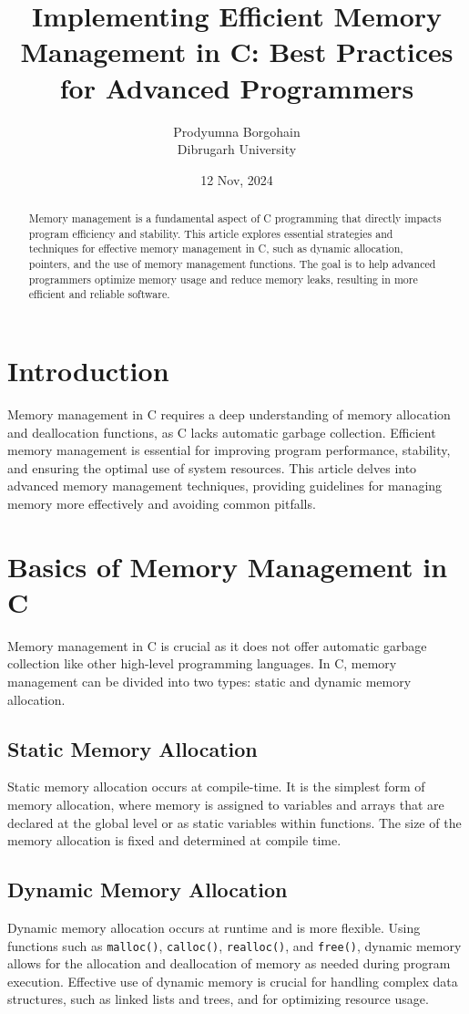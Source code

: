 \documentclass[a4paper,12pt]{article}
\title{\textbf{Implementing Efficient Memory Management in C: Best Practices for Advanced Programmers}}
\author{Prodyumna Borgohain \\ Dibrugarh University}
\date{12 Nov, 2024}
\begin{document}
\maketitle

\begin{abstract}
Memory management is a fundamental aspect of C programming that directly impacts program efficiency and stability. This article explores essential strategies and techniques for effective memory management in C, such as dynamic allocation, pointers, and the use of memory management functions. The goal is to help advanced programmers optimize memory usage and reduce memory leaks, resulting in more efficient and reliable software.
\end{abstract}


\section{Introduction}
Memory management in C requires a deep understanding of memory allocation and deallocation functions, as C lacks automatic garbage collection. Efficient memory management is essential for improving program performance, stability, and ensuring the optimal use of system resources. This article delves into advanced memory management techniques, providing guidelines for managing memory more effectively and avoiding common pitfalls.

\section{Basics of Memory Management in C}
Memory management in C is crucial as it does not offer automatic garbage collection like other high-level programming languages. In C, memory management can be divided into two types: static and dynamic memory allocation.

\subsection*{Static Memory Allocation}
Static memory allocation occurs at compile-time. It is the simplest form of memory allocation, where memory is assigned to variables and arrays that are declared at the global level or as static variables within functions. The size of the memory allocation is fixed and determined at compile time.

\subsection*{Dynamic Memory Allocation}
Dynamic memory allocation occurs at runtime and is more flexible. Using functions such as \texttt{malloc()}, \texttt{calloc()}, \texttt{realloc()}, and \texttt{free()}, dynamic memory allows for the allocation and deallocation of memory as needed during program execution. Effective use of dynamic memory is crucial for handling complex data structures, such as linked lists and trees, and for optimizing resource usage.
\end{document}
